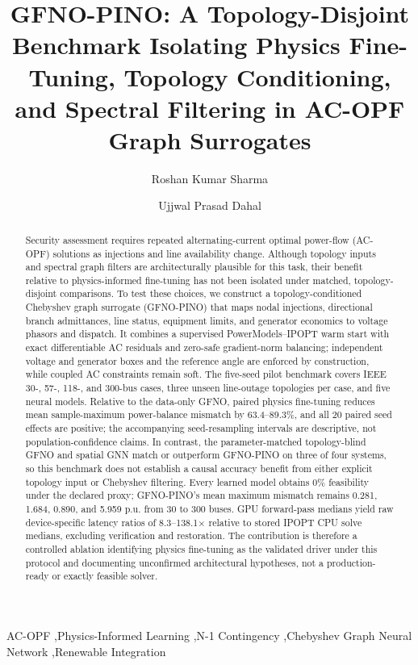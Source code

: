 \documentclass[final,5p,times,twocolumn]{elsarticle}
\begin{document}
\raggedbottom

\begin{frontmatter}

\title{GFNO-PINO: A Topology-Disjoint Benchmark Isolating Physics
Fine-Tuning, Topology Conditioning, and Spectral Filtering in AC-OPF Graph
Surrogates}

\author[inst1]{Roshan Kumar Sharma}
\author[inst1]{Ujjwal Prasad Dahal}


\begin{abstract}
Security assessment requires repeated alternating-current optimal power-flow
(AC-OPF) solutions as injections and line availability change. Although
topology inputs and spectral graph filters are architecturally plausible for
this task, their benefit relative to physics-informed fine-tuning has not been
isolated under matched, topology-disjoint comparisons. To test these choices,
we construct a topology-conditioned Chebyshev graph surrogate (GFNO-PINO) that
maps nodal injections, directional branch admittances, line status, equipment
limits, and generator economics to voltage phasors and dispatch. It combines a
supervised PowerModels--IPOPT warm start with exact differentiable AC
residuals and zero-safe gradient-norm balancing; independent voltage and
generator boxes and the reference angle are enforced by construction, while
coupled AC constraints remain soft. The five-seed pilot benchmark covers IEEE
30-, 57-, 118-, and 300-bus cases, three unseen line-outage topologies per
case, and five neural models. Relative to the data-only GFNO, paired physics
fine-tuning reduces mean sample-maximum power-balance mismatch by
63.4--89.3\%, and all 20 paired seed effects are positive; the accompanying
seed-resampling intervals are descriptive, not population-confidence claims.
In contrast, the parameter-matched topology-blind GFNO and spatial GNN match
or outperform GFNO-PINO on three of four systems, so this benchmark does not
establish a causal accuracy benefit from either explicit topology input or
Chebyshev filtering. Every learned model obtains 0\% feasibility under the
declared proxy; GFNO-PINO's mean maximum mismatch remains 0.281, 1.684, 0.890,
and 5.959 p.u. from 30 to 300 buses. GPU forward-pass medians yield raw
device-specific latency ratios of 8.3--138.1$\times$ relative to stored IPOPT
CPU solve medians, excluding verification and restoration. The contribution
is therefore a controlled ablation identifying physics fine-tuning as the
validated driver under this protocol and documenting unconfirmed
architectural hypotheses, not a production-ready or exactly feasible solver.
\end{abstract}

\begin{keyword}
AC-OPF \sep Physics-Informed Learning \sep N-1 Contingency
\sep Chebyshev Graph Neural Network \sep Renewable Integration
\end{keyword}

\end{frontmatter}
\end{document}
